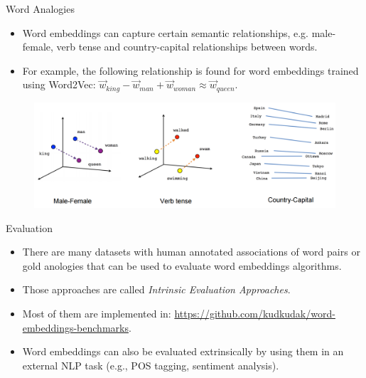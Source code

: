 \documentclass[handout]{beamer}
\begin{document}
\begin{frame}{Word Analogies}
\begin{scriptsize}
\begin{itemize}
   
\item Word embeddings can capture certain semantic relationships, e.g. male-female, verb tense and country-capital relationships between words.

\item For example, the following relationship is found for word embeddings
trained using Word2Vec: $\vec{w}_{king} - \vec{w}_{man} + \vec{w}_{woman} \approx \vec{w}_{queen}$.

    
\end{itemize}

 \begin{figure}[h]
    	\includegraphics[scale = 0.2]{pics/linear-relationships.png}
    \end{figure}

\end{scriptsize}
\end{frame}


\begin{frame}{Evaluation}
\begin{scriptsize}
\begin{itemize}
   
\item There are many datasets with human annotated associations of word pairs or gold anologies that can be used to evaluate word embeddings algorithms.

\item Those approaches are called \textit{Intrinsic Evaluation Approaches}.

\item Most of them are implemented in: \url{https://github.com/kudkudak/word-embeddings-benchmarks}.

\item Word embeddings can also be evaluated extrinsically by using them in an external NLP task (e.g., POS tagging, sentiment analysis).

    
\end{itemize}



\end{scriptsize}
\end{frame}
\end{document}
